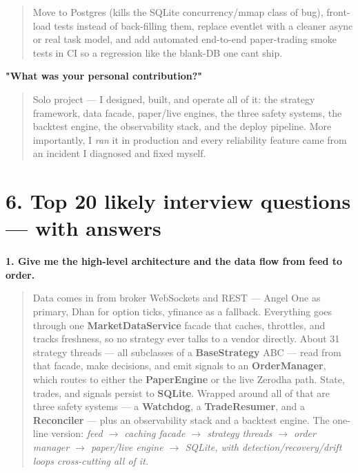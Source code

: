 \documentclass[11pt]{article}
\begin{document}
\begin{quote}
Move to Postgres (kills the SQLite concurrency/mmap class of bug), front-load tests instead of
back-filling them, replace eventlet with a cleaner async or real task model, and add automated
end-to-end paper-trading smoke tests in CI so a regression like the blank-DB one can\textquotesingle t ship.
\end{quote}

\textbf{"What was your personal contribution?"}

\begin{quote}
Solo project --- I designed, built, and operate all of it: the strategy framework, data facade,
paper/live engines, the three safety systems, the backtest engine, the observability stack, and
the deploy pipeline. More importantly, I \emph{ran} it in production and every reliability feature
came from an incident I diagnosed and fixed myself.
\end{quote}

\section{6. Top 20 likely interview questions --- with answers}\label{6-top-20-likely-interview-questions--with-answers}

\textbf{1. Give me the high-level architecture and the data flow from feed to order.}

\begin{quote}
Data comes in from broker WebSockets and REST --- Angel One as primary, Dhan for option ticks,
yfinance as a fallback. Everything goes through one \textbf{MarketDataService} facade that caches,
throttles, and tracks freshness, so no strategy ever talks to a vendor directly. About 31
strategy threads --- all subclasses of a \textbf{BaseStrategy} ABC --- read from that facade, make
decisions, and emit signals to an \textbf{OrderManager}, which routes to either the \textbf{PaperEngine}
or the live Zerodha path. State, trades, and signals persist to \textbf{SQLite}. Wrapped around all
of that are three safety systems --- a \textbf{Watchdog}, a \textbf{TradeResumer}, and a \textbf{Reconciler} ---
plus an observability stack and a backtest engine. The one-line version: \emph{feed \(\rightarrow\) caching facade
\(\rightarrow\) strategy threads \(\rightarrow\) order manager \(\rightarrow\) paper/live engine \(\rightarrow\) SQLite, with detection/recovery/drift
loops cross-cutting all of it.}
\end{quote}
\end{document}
